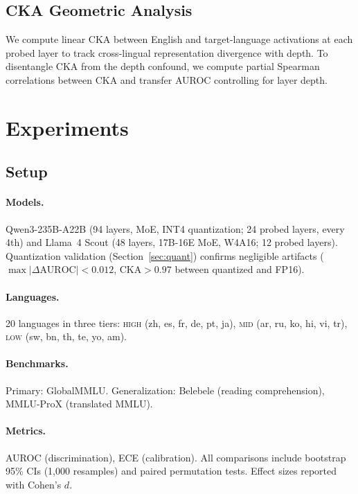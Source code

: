 \documentclass[11pt,a4paper]{article}
\newcommand{\auroc}{AUROC}
\begin{document}
\subsection{CKA Geometric Analysis}
We compute linear CKA between English and target-language activations at each probed layer to track cross-lingual representation divergence with depth. To disentangle CKA from the depth confound, we compute partial Spearman correlations between CKA and transfer \auroc{} controlling for layer depth.


\section{Experiments}

\subsection{Setup}

\paragraph{Models.} Qwen3-235B-A22B (94 layers, MoE, INT4 quantization; 24 probed layers, every 4th) and Llama~4 Scout (48 layers, 17B-16E MoE, W4A16; 12 probed layers). Quantization validation (Section~\ref{sec:quant}) confirms negligible artifacts ($\max |\Delta\text{\auroc{}}| < 0.012$, CKA$>0.97$ between quantized and FP16).

\paragraph{Languages.} 20 languages in three tiers: \textsc{high} (zh, es, fr, de, pt, ja), \textsc{mid} (ar, ru, ko, hi, vi, tr), \textsc{low} (sw, bn, th, te, yo, am).

\paragraph{Benchmarks.} Primary: GlobalMMLU. Generalization: Belebele (reading comprehension), MMLU-ProX (translated MMLU).

\paragraph{Metrics.} \auroc{} (discrimination), ECE (calibration). All comparisons include bootstrap 95\% CIs (1,000 resamples) and paired permutation tests. Effect sizes reported with Cohen's $d$.
\end{document}

